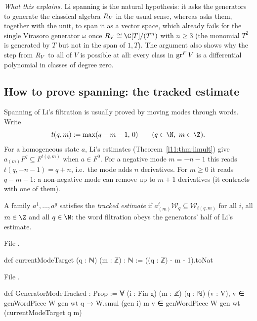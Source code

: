 \emph{What this explains.} Li spanning is the natural hypothesis: it asks the generators to generate the classical
algebra $R_V$ in the usual sense, whereas  asks them, together with the unit, to span it as a vector space, which
already fails for the single Virasoro generator $\omega$ once $\lelevenR\cong\C[T]/(T^n)$ with $n\ge3$ (the monomial
$T^2$ is generated by $T$ but not in the span of $1,T$). The argument also shows why the step from $R_V$
to all of $V$ is possible at all: every class in $\operatorname{gr}^FV$ is a differential polynomial in classes of degree zero.

\subsection{How to prove spanning: the tracked estimate}\label{l11:sec:genwords-spanning}

Spanning of Li's filtration is usually proved by moving modes through words. Write
\begin{equation*}
  t(q,m) := \max(q-m-1,\,0)\qquad(q\in\N,\ m\in\Z).
\end{equation*}
For a homogeneous state $a$, Li's estimates (Theorem~\ref{l11:thm:limult}) give $a_{(m)}F^q\subseteq F^{t(q,m)}$ when $a\in F^0$.
For a negative mode $m=-n-1$ this reads $t(q,-n-1) = q+n$, i.e.\ the mode adds $n$ derivatives. For $m\ge0$ it reads
$q-m-1$: a non-negative mode can remove up to $m+1$ derivatives (it contracts with one of them).

\begin{definition}\label{l11:def:tracked}
A family $a^1,\dots,a^g$ satisfies the \emph{tracked estimate} if $a^i_{(m)}\mathcal W_q\subseteq \mathcal W_{t(q,m)}$ for all
$i$, all $m\in\Z$ and all $q\in\N$: the word filtration obeys the generators' half of Li's estimate.
\end{definition}
\noindent File .
\begin{leancode}
def currentModeTarget (q : ℕ) (m : ℤ) : ℕ := ((q : ℤ) - m - 1).toNat
\end{leancode}
\noindent File .
\begin{leancode}
def GeneratorModeTracked : Prop :=
  ∀ (i : Fin g) (m : ℤ) (q : ℕ) (v : V), v ∈ genWordPiece W gen wt q →
    W.smul (gen i) m v ∈ genWordPiece W gen wt (currentModeTarget q m)
\end{leancode}

